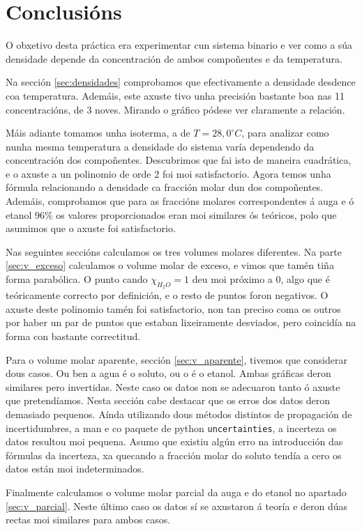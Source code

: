 \documentclass[12pt, a4paper, titlepage]{article}
\begin{document}
  \newpage
  \part{Conclusións}

  O obxetivo desta práctica era experimentar cun sistema binario e ver como a súa densidade depende da concentración de ambos compoñentes e da temperatura.

  Na sección \ref{sec:densidades} comprobamos que efectivamente a densidade desdence coa temperatura. Ademáis, este axuste tivo unha precisión bastante boa nas 11 concentracións, de 3 noves. Mirando o gráfico pódese ver claramente a relación.

  Máis adiante tomamos unha isoterma, a de $T = 28,0 ^\circ C$, para analizar como nunha mesma temperatura a densidade do sistema varía dependendo da concentración dos compoñentes. Descubrimos que fai isto de maneira cuadrática, e o axuste a un polinomio de orde 2 foi moi satisfactorio. Agora temos unha fórmula relacionando a densidade ca fracción molar dun dos compoñentes. Ademáis, comprobamos que para as fraccións molares correspondentes á auga e ó etanol $96 \%$ os valores proporcionados eran moi similares ós teóricos, polo que asumimos que o axuste foi satisfactorio.

  Nas seguintes seccións calculamos os tres volumes molares diferentes. Na parte \ref{sec:v_exceso} calculamos o volume molar de exceso, e vimos que tamén tiña forma parabólica. O punto cando $\chi_{H_2O} = 1$ deu moi próximo a 0, algo que é teóricamente correcto por definición, e o resto de puntos foron negativos. O axuste deste polinomio tamén foi satisfactorio, non tan preciso coma os outros por haber un par de puntos que estaban lixeiramente desviados, pero coincidía na forma con bastante correctitud.

  Para o volume molar aparente, sección \ref{sec:v_aparente}, tivemos que considerar dous casos. Ou ben a agua é o soluto, ou o é o etanol. Ambas gráficas deron similares pero invertidas. Neste caso os datos non se adecuaron tanto ó axuste que pretendíamos. Nesta sección cabe destacar que os erros dos datos deron demasiado pequenos. Aínda utilizando dous métodos distintos de propagación de incertidumbres, a man e co paquete de python \texttt{uncertainties}, a incerteza os datos resultou moi pequena. Asumo que existiu algún erro na introducción das fórmulas da incerteza, xa quecando a fracción molar do soluto tendía a cero os datos están moi indeterminados.

  Finalmente calculamos o volume molar parcial da auga e do etanol no apartado \ref{sec:v_parcial}. Neste último caso os datos sí se axustaron á teoría e deron dúas rectas moi similares para ambos casos.
\end{document}

